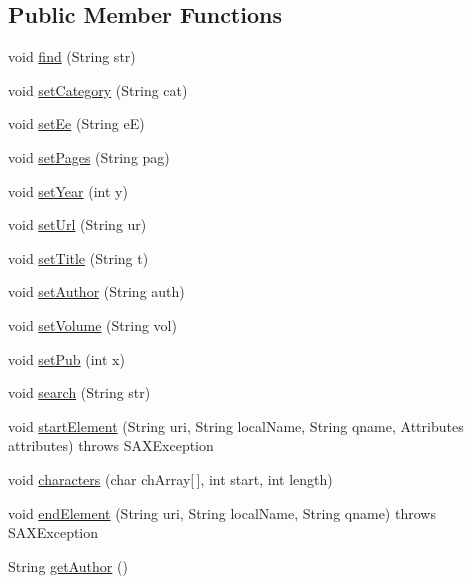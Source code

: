 \subsection*{Public Member Functions}
\begin{DoxyCompactItemize}
\item 
void \hyperlink{classXmlHandlerAuthor_a860da9fa6849b4dd8f362953faf14bcd}{find} (String str)
\item 
void \hyperlink{classXmlHandlerAuthor_ac509e27b7db234c3a8e6b537c05b0788}{set\-Category} (String cat)
\item 
void \hyperlink{classXmlHandlerAuthor_ae6dc18dbbb71e72db582f0964c655d74}{set\-Ee} (String e\-E)
\item 
void \hyperlink{classXmlHandlerAuthor_a34ffa560bb70eac46df935f5cdca6bcf}{set\-Pages} (String pag)
\item 
void \hyperlink{classXmlHandlerAuthor_a74cb8d94ee14ab382253abc5a38d6b8e}{set\-Year} (int y)
\item 
void \hyperlink{classXmlHandlerAuthor_a6137e5065cb6e2050ef6b9d1a2a50e48}{set\-Url} (String ur)
\item 
void \hyperlink{classXmlHandlerAuthor_afe6d790275f8d30f0ab3527b1aea934b}{set\-Title} (String t)
\item 
void \hyperlink{classXmlHandlerAuthor_a0635610c34233b096c4f47b5746a8d1c}{set\-Author} (String auth)
\item 
void \hyperlink{classXmlHandlerAuthor_a1e0a5b957fd643726ff122517e2d81c1}{set\-Volume} (String vol)
\item 
void \hyperlink{classXmlHandlerAuthor_acb7a439c54a29c688fc36190a529581f}{set\-Pub} (int x)
\item 
void \hyperlink{classXmlHandlerAuthor_ab9c56f83a382d3c70a0d3eb65e02272c}{search} (String str)
\item 
void \hyperlink{classXmlHandlerAuthor_adac17a195135fb961bb4a8b932138152}{start\-Element} (String uri, String local\-Name, String qname, Attributes attributes)  throws S\-A\-X\-Exception
\item 
void \hyperlink{classXmlHandlerAuthor_ad97c3844a098280d675ac0e703ac4e27}{characters} (char ch\-Array\mbox{[}$\,$\mbox{]}, int start, int length)
\item 
void \hyperlink{classXmlHandlerAuthor_ae6175824e08db40f2862bd06297d6847}{end\-Element} (String uri, String local\-Name, String qname)  throws S\-A\-X\-Exception
\item 
String \hyperlink{classXmlHandlerAuthor_a6f0222c5f34364a6c1d0906237cdf45a}{get\-Author} ()

\end{DoxyCompactItemize}
